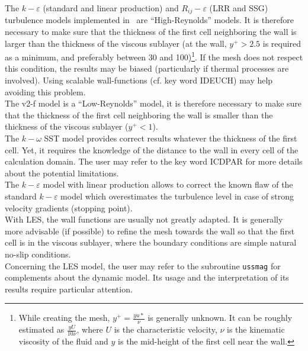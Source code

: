 The $k-\varepsilon$ (standard and linear production) and $R_{ij}-\varepsilon$
(LRR and SSG) turbulence
models implemented in \CS\ are ``High-Reynolds'' models. It is therefore
necessary to make sure that the thickness of the first cell neighboring
the wall is larger than the thickness of the viscous sublayer (at the
wall, $y^+>2.5$ is required as a minimum, and preferably between 30 and
100)\footnote{While creating the mesh, $y^+=\frac{yu*}{\nu}$ is
generally unknown. It can be roughly estimated as $\frac{yU}{10\nu}$, where 
$U$ is the characteristic velocity, $\nu$ is the kinematic viscosity of the fluid
 and $y$ is the mid-height of the first cell near the wall.}. If the mesh does
 not respect this condition, the results may be biased
(particularly if thermal processes are involved). Using scalable wall-functions
(cf. key word IDEUCH) may help avoiding this problem.\\
The v2-f model is a ``Low-Reynolds'' model, it is therefore necessary to
make sure that the thickness of the first cell neighboring the wall is
smaller than the thickness of the viscous sublayer ($y^+<1$).\\
The $k-\omega$ SST model provides correct results whatever the thickness of the first cell.
Yet, it requires the knowledge of the distance to the wall in every
cell of the calculation domain. The user may refer to the key word
ICDPAR for more details about the potential limitations.\\
The $k-\varepsilon$ model with linear production allows to correct the
known flaw of the standard $k-\varepsilon$ model which overestimates the
turbulence level in case of strong velocity gradients (stopping point).\\
With LES, the wall functions are usually not greatly adapted. It is generally more advisable
(if possible) to refine the mesh towards the wall so that the first cell is in the
viscous sublayer, where the boundary conditions are simple natural no-slip conditions.\\
Concerning the LES model, the user may refer to the subroutine
\texttt{ussmag} for complements about the dynamic model. Its usage
and the interpretation of its results require particular attention.\\

